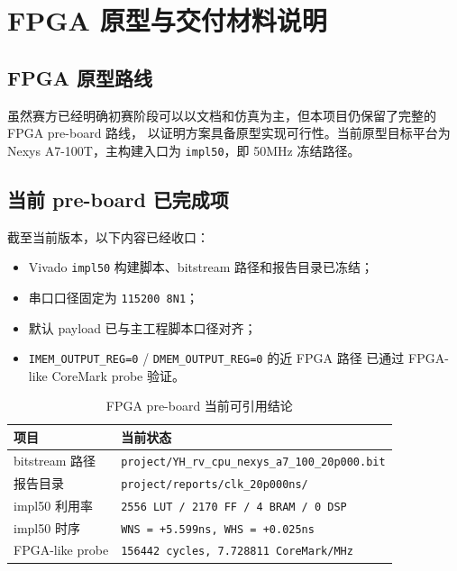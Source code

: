 \section{FPGA 原型与交付材料说明}

\subsection{FPGA 原型路线}

虽然赛方已经明确初赛阶段可以以文档和仿真为主，但本项目仍保留了完整的 FPGA pre-board 路线，
以证明方案具备原型实现可行性。当前原型目标平台为 Nexys A7-100T，主构建入口为
\texttt{impl50}，即 50MHz 冻结路径。

\subsection{当前 pre-board 已完成项}

截至当前版本，以下内容已经收口：

\begin{itemize}
    \item Vivado \texttt{impl50} 构建脚本、bitstream 路径和报告目录已冻结；
    \item 串口口径固定为 \texttt{115200 8N1}；
    \item 默认 payload 已与主工程脚本口径对齐；
    \item \texttt{IMEM\_OUTPUT\_REG=0} / \texttt{DMEM\_OUTPUT\_REG=0} 的近 FPGA 路径
    已通过 FPGA-like CoreMark probe 验证。
\end{itemize}

\begin{table}[H]
    \centering
    \caption{FPGA pre-board 当前可引用结论}
    \begin{tabular}{p{} p{}}
        \toprule
        项目 & 当前状态 \\
        \midrule
        bitstream 路径 & \texttt{project/YH\_rv\_cpu\_nexys\_a7\_100\_20p000.bit} \\
        报告目录 & \texttt{project/reports/clk\_20p000ns/} \\
        impl50 利用率 & \texttt{2556 LUT / 2170 FF / 4 BRAM / 0 DSP} \\
        impl50 时序 & \texttt{WNS = +5.599ns, WHS = +0.025ns} \\
        FPGA-like probe & \texttt{156442 cycles, 7.728811 CoreMark/MHz} \\
        \bottomrule
    \end{tabular}
\end{table}

